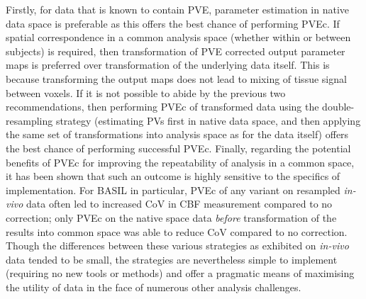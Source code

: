Firstly, for data that is known to contain PVE, parameter estimation in native data space is preferable as this offers the best chance of performing PVEc. If spatial correspondence in a common analysis space (whether within or between subjects) is required, then transformation of PVE corrected output parameter maps is preferred over transformation of the underlying data itself. This is because transforming the output maps does not lead to mixing of tissue signal between voxels. If it is not possible to abide by the previous two recommendations, then performing PVEc of transformed data using the double-resampling strategy (estimating PVs first in native data space, and then applying the same set of transformations into analysis space as for the data itself) offers the best chance of performing successful PVEc. Finally, regarding the potential benefits of PVEc for improving the repeatability of analysis in a common space, it has been shown that such an outcome is highly sensitive to the specifics of implementation. For BASIL in particular, PVEc of any variant on resampled \textit{in-vivo} data often led to increased CoV in CBF measurement compared to no correction; only PVEc on the native space data \textit{before} transformation of the results into common space was able to reduce CoV compared to no correction. Though the differences between these various strategies as exhibited on \textit{in-vivo} data tended to be small, the strategies are nevertheless simple to implement (requiring no new tools or methods) and offer a pragmatic means of maximising the utility of data in the face of numerous other analysis challenges. 


